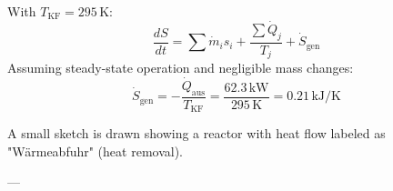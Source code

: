 With \( T_{\text{KF}} = 295 \, \text{K} \):  
\[
\frac{dS}{dt} = \sum \dot{m}_i s_i + \frac{\sum \dot{Q}_j}{T_j} + \dot{S}_{\text{gen}}
\]  
Assuming steady-state operation and negligible mass changes:  
\[
\dot{S}_{\text{gen}} = -\frac{\dot{Q}_{\text{aus}}}{T_{\text{KF}}} = \frac{62.3 \, \text{kW}}{295 \, \text{K}} = 0.21 \, \text{kJ/K}
\]  

A small sketch is drawn showing a reactor with heat flow labeled as "Wärmeabfuhr" (heat removal).  

---